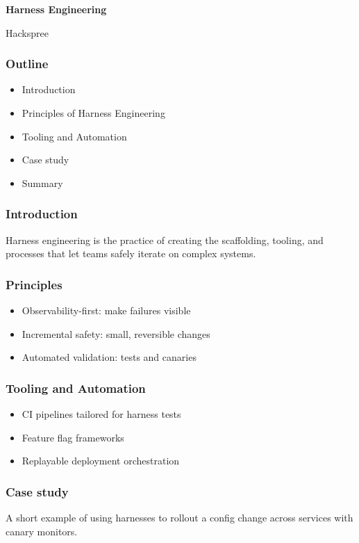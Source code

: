 \documentclass[aspectratio=169]{beamer}
\begin{document}
\begin{frame}[plain]
\centering
{
{\LARGE\bfseries Harness Engineering}
}

\vspace{0.4cm}

{\Large
Hackspree\\
}

\end{frame}

\begin{frame}
\frametitle{Outline}
\begin{itemize}
  \item Introduction
  \item Principles of Harness Engineering
  \item Tooling and Automation
  \item Case study
  \item Summary
\end{itemize}
\end{frame}

\begin{frame}
\frametitle{Introduction}
Harness engineering is the practice of creating the scaffolding, tooling, and processes that let teams safely iterate on complex systems.
\end{frame}

\begin{frame}
\frametitle{Principles}
\begin{itemize}
  \item Observability-first: make failures visible
  \item Incremental safety: small, reversible changes
  \item Automated validation: tests and canaries
\end{itemize}
\end{frame}

\begin{frame}
\frametitle{Tooling and Automation}
\begin{itemize}
  \item CI pipelines tailored for harness tests
  \item Feature flag frameworks
  \item Replayable deployment orchestration
\end{itemize}
\end{frame}

\begin{frame}
\frametitle{Case study}
A short example of using harnesses to rollout a config change across services with canary monitors.
\end{frame}
\end{document}
